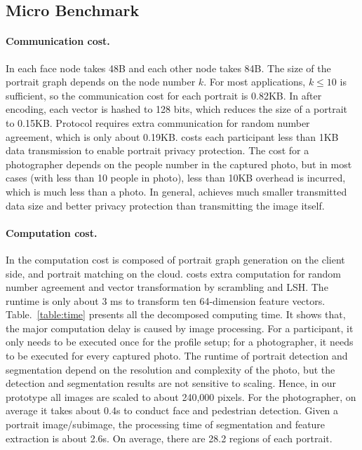 \vspace{-0.1in}
\subsection{Micro Benchmark}
\vspace{-0.1in}



\paragraph{Communication cost.} In \basic each face node takes 48B and each other node takes 84B.
The size of the portrait graph depends on the node number $k$.
For most applications, $k \leq 10$ is sufficient,
so the communication cost for each portrait is 0.82KB.
In \advanced after encoding, each vector is hashed to 128 bits,
 which reduces the size of a portrait to 0.15KB.
Protocol \advanced requires extra communication for random number agreement,
 which is only about 0.19KB.
\ourprotocol
costs each participant less than 1KB data transmission to
enable portrait privacy protection.
The cost for a photographer depends on the people number in the captured photo,
 but in most cases (with less than 10 people in photo), less than 10KB overhead is incurred, which is much less than a photo.
In general, \ourprotocol achieves much smaller transmitted data size and better privacy protection
 than transmitting the image itself.






\paragraph{Computation cost.}
In \basic the computation cost is composed of portrait graph
generation on the client side, and portrait matching on the cloud.
\advanced costs extra computation for random number agreement and vector transformation by scrambling and LSH.
The runtime is only about 3 ms to transform ten 64-dimension feature vectors.
Table.~\ref{table:time} presents all the decomposed computing time.
It shows that,
 the major computation delay is caused by image processing.
For a participant, it only needs to be executed once for the profile setup;
for a photographer, it needs to be executed for every captured photo.
The runtime of portrait detection and segmentation depend on the
resolution and complexity of the photo,
but the detection and segmentation results are not sensitive to scaling.
Hence, in our prototype all images are scaled to about 240,000 pixels.
For the photographer, on average it takes about 0.4s to conduct face
and pedestrian detection.
Given a portrait image/subimage,
the processing time of segmentation and feature extraction is about 2.6s.
On average, there are 28.2 regions of each portrait.


